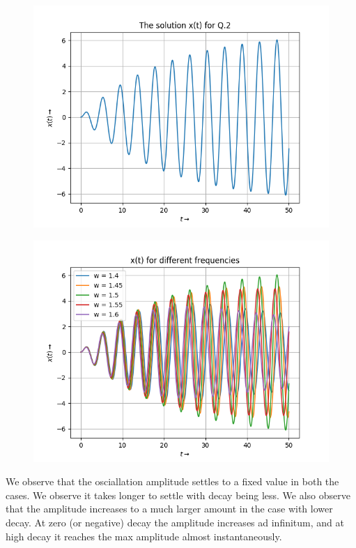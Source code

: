 \documentclass[11pt, a4paper]{article}
\begin{document}
\begin{figure}[!tbh]
   	\centering
   	\includegraphics[scale=0.5]{Figure_1.png}
   	\label{fig:32}
   \end{figure}
\begin{figure}[!tbh]
   	\centering
   	\includegraphics[scale=0.5]{Figure_2.png}
   	\label{fig:32}
   \end{figure}
{
We observe that the osciallation amplitude settles to  a fixed value in both the cases.
We observe it takes longer to settle with decay being less.
We also observe that the amplitude increases to a much larger amount in the case with lower decay.
At zero (or negative) decay the amplitude increases ad infinitum, and at high decay it reaches the max amplitude almost instantaneously.
}
\end{document}
